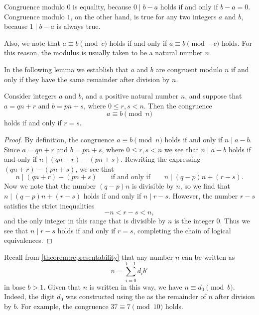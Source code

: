 \begin{remark}
  Congruence modulo $0$ is equality, because $0\mid b-a$ holds if and only if $b-a=0$. Congruence modulo $1$, on the other hand, is true for any two integers $a$ and $b$, because $1\mid b-a$ is always true.

  Also, we note that $a\equiv b\pmod{c}$ holds if and only if $a\equiv b\pmod{{-}c}$ holds. For this reason, the modulus is usually taken to be a natural number $n$.
\end{remark}

In the following lemma we establish that $a$ and $b$ are congruent modulo $n$ if and only if they have the same remainder after division by $n$.

\begin{lemma}
  Consider integers $a$ and $b$, and a positive natural number $n$, and suppose that $a=qn+r$ and $b=pn+s$, where $0\leq r,s<n$. Then the congruence
  \begin{equation*}
    a\equiv b\pmod{n}
  \end{equation*}
  holds if and only if $r=s$.
\end{lemma}

\begin{proof}
  By definition, the congruence $a\equiv b\pmod{n}$ holds if and only if $n\mid a-b$. Since $a=qn+r$ and $b=pn+s$, where $0\leq r,s<n$ we see that $n\mid a-b$ holds if and only if $n\mid (qn+r)-(pn+s)$. Rewriting the expressing $(qn+r)-(pn+s)$, we see that
  \begin{equation*}
    n\mid (qn+r)-(pn+s)\qquad\text{if and only if}\qquad n\mid (q-p)n+(r-s).
  \end{equation*}
  Now we note that the number $(q-p)n$ is divisible by $n$, so we find that $n\mid (q-p)n+(r-s)$ holds if and only if $n\mid r-s$. However, the number $r-s$ satisfies the strict inequalities
  \begin{equation*}
    -n<r-s<n,
  \end{equation*}
  and the only integer in this range that is divisible by $n$ is the integer $0$. Thus we see that $n\mid r-s$ holds if and only if $r=s$, completing the chain of logical equivalences.
\end{proof}

\begin{example}
  Recall from \cref{theorem:representability} that any number $n$ can be written as
  \begin{equation*}
    n = \sum_{i=0}^{l-1} d_i b^{i}
  \end{equation*}
  in base $b>1$. Given that $n$ is written in this way, we have $n \equiv d_0\pmod b$. Indeed, the digit $d_0$ was constructed using the  as the remainder of $n$ after division by $b$. For example, the congruence $37 \equiv 7\pmod{10}$ holds.
\end{example}

